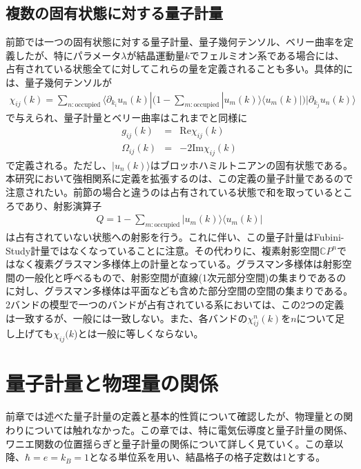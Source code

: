 \documentclass[12pt]{jsbook}
\newcommand{\la}{\langle}
\newcommand{\ra}{\rangle}
\newcommand{\pa}{\partial}
\begin{document}
\section{複数の固有状態に対する量子計量}
前節では一つの固有状態に対する量子計量、量子幾何テンソル、ベリー曲率を定義したが、特にパラメータ$\lambda$が結晶運動量$k$でフェルミオン系である場合には、占有されている状態全てに対してこれらの量を定義されることも多い。具体的には、量子幾何テンソルが
\begin{eqnarray}
\chi_{ij}(k)=\displaystyle \sum_{n:\mathrm{occupied}}\la \pa_{k_i} u_n(k)|\Big(1-\displaystyle\sum_{m:\mathrm{occupied}}|u_m(k)\ra\la u_m(k)|\Big)|\pa_{k_j} u_n(k)\ra
\end{eqnarray}
で与えられ、量子計量とベリー曲率はこれまでと同様に
\begin{eqnarray}
    g_{ij}(k)&=&\mathrm{Re} \chi_{ij}(k)\\
    \Omega_{ij}(k)&=&-2\mathrm{Im}\chi_{ij}(k)
\end{eqnarray}
で定義される。ただし、$|u_n(k)\ra$はブロッホハミルトニアンの固有状態である。本研究において強相関系に定義を拡張するのは、この定義の量子計量であるので注意されたい。前節の場合と違うのは占有されている状態で和を取っているところであり、射影演算子
\begin{eqnarray}
    Q=1-\displaystyle\sum_{m:\mathrm{occupied}}|u_m(k)\ra\la u_m(k)|
\end{eqnarray}
は占有されていない状態への射影を行う。これに伴い、この量子計量はFubini-Study計量ではなくなっていることに注意。その代わりに、複素射影空間$\mathbb{C}P^n$ではなく複素グラスマン多様体上の計量となっている。グラスマン多様体は射影空間の一般化と呼べるもので、射影空間が直線(1次元部分空間)の集まりであるのに対し、グラスマン多様体は平面なども含めた部分空間の空間の集まりである\cite{nakahara2018geometry}。2バンドの模型で一つのバンドが占有されている系においては、この2つの定義は一致するが、一般には一致しない。また、各バンドの$\chi^n_{ij}(k)$を$n$について足し上げても$\chi_{ij}(k$)とは一般に等しくならない。

\chapter{量子計量と物理量の関係}
前章では述べた量子計量の定義と基本的性質について確認したが、物理量との関わりについては触れなかった。この章では、特に電気伝導度と量子計量の関係、ワニエ関数の位置揺らぎと量子計量の関係について詳しく見ていく。この章以降、$\hbar=e=k_B=1$となる単位系を用い、結晶格子の格子定数は1とする。
\end{document}

